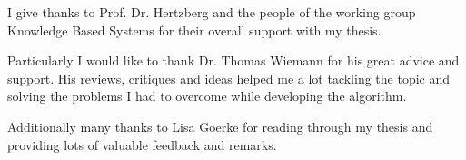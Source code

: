 \documentclass[Thesis.tex]{subfiles}
\begin{document}
I give thanks to Prof. Dr. Hertzberg and the people of the working group Knowledge Based Systems for their overall support with my thesis.

Particularly I would like to thank Dr. Thomas Wiemann for his great advice and support. His reviews, critiques and ideas helped me a lot tackling the topic and solving the problems I had to overcome while developing the algorithm.

Additionally many thanks to Lisa Goerke for reading through my thesis and providing lots of valuable feedback and remarks.
\end{document}
